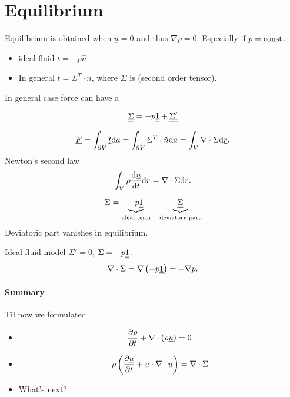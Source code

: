 \documentclass[11pt,oneside]{book}
\renewcommand{\vec}[1]{\underline{#1}}
\theoremstyle{definition} %
\theoremstyle{plain} %
\theoremstyle{remark} %
\theoremstyle{underline}
\begin{document}
  \section{Equilibrium}
  Equilibrium is obtained when $\vec u = 0$ and thus $\nabla p = 0$.
  Especially if $p = \textrm{const}$.
  \begin{itemize}
    \item ideal fluid $ \vec t = - p \hat n$
    \item In general $ \vec t = \Sigma^T \cdot \vec n$, where $\Sigma$ is  (second order tensor).
  \end{itemize}
  In general case force can have a 
  
  \begin{displaymath}
    \ul{\ul{\Sigma}} = - p \ul{\ul{1}} + \ul{\ul{\Sigma'}} %
  \end{displaymath}


  \begin{displaymath}
    \vec F = \int_{\partial V} \vec t \d a = \int_{\partial V} \Sigma^T \cdot \hat n \d a = \int_V \nabla \cdot \Sigma \d \vec r.
  \end{displaymath}
  Newton's second law
  \begin{displaymath}
    \int_V \rho \dfrac{\vec u}{t} \d \vec r = \nabla \cdot \Sigma \d \vec r.
  \end{displaymath}

  \begin{displaymath}
    \Sigma = \underbrace{- p \underline{\underline{1}}}_{\textrm{ideal term}} + \underbrace{\underline{\underline{\Sigma}}}_{\textrm{deviatory part}}
  \end{displaymath}
  Deviatoric part vanishes in equilibrium.

  Ideal fluid model $\Sigma' = 0$, $\Sigma = - p \underline{\underline{1}}$.
  \begin{displaymath}
    \nabla \cdot \Sigma = \nabla \left( - p \underline{\underline{1}} \right) = - \nabla p.
  \end{displaymath}

  \paragraph{Summary}
  Til now we formulated
  
  \begin{itemize}
    \item 
      \begin{displaymath}
          \ptf{\rho}{t} + \nabla \cdot ( \rho \vec u ) = 0
      \end{displaymath}
    \item \begin{displaymath}
        \rho \left( \ptf{\vec u }{t} + \vec u \cdot \nabla \cdot \vec u  \right) = \nabla \cdot \Sigma
    \end{displaymath}
  \item What's next?
  \end{itemize}
\end{document}
